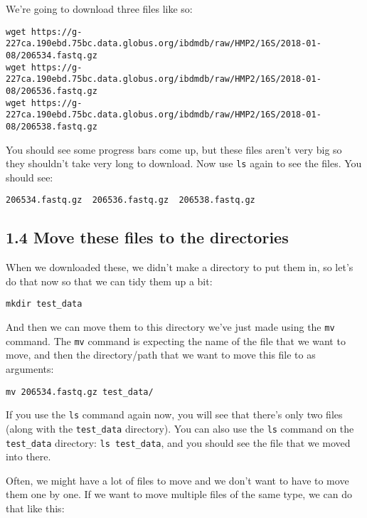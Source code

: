 \documentclass[
]{book}
\begin{document}
We're going to download three files like so:

\begin{verbatim}
wget https://g-227ca.190ebd.75bc.data.globus.org/ibdmdb/raw/HMP2/16S/2018-01-08/206534.fastq.gz
wget https://g-227ca.190ebd.75bc.data.globus.org/ibdmdb/raw/HMP2/16S/2018-01-08/206536.fastq.gz
wget https://g-227ca.190ebd.75bc.data.globus.org/ibdmdb/raw/HMP2/16S/2018-01-08/206538.fastq.gz
\end{verbatim}

You should see some progress bars come up, but these files aren't very big so they shouldn't take very long to download. Now use \texttt{ls} again to see the files. You should see:

\begin{verbatim}
206534.fastq.gz  206536.fastq.gz  206538.fastq.gz
\end{verbatim}

\subsection{1.4 Move these files to the directories}\label{move-these-files-to-the-directories}

When we downloaded these, we didn't make a directory to put them in, so let's do that now so that we can tidy them up a bit:

\begin{verbatim}
mkdir test_data
\end{verbatim}

And then we can move them to this directory we've just made using the \texttt{mv} command. The \texttt{mv} command is expecting the name of the file that we want to move, and then the directory/path that we want to move this file to as arguments:

\begin{verbatim}
mv 206534.fastq.gz test_data/
\end{verbatim}

If you use the \texttt{ls} command again now, you will see that there's only two files (along with the \texttt{test\_data} directory). You can also use the \texttt{ls} command on the \texttt{test\_data} directory: \texttt{ls\ test\_data}, and you should see the file that we moved into there.

Often, we might have a lot of files to move and we don't want to have to move them one by one. If we want to move multiple files of the same type, we can do that like this:
\end{document}
